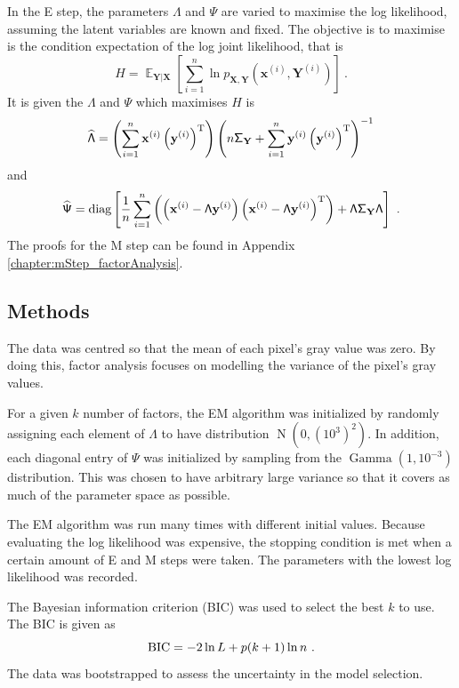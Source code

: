 \documentclass[12pt]{report}
\DeclareMathOperator{\expectation}{\mathbb{E}}
\DeclareMathOperator{\normal}{N}
\DeclareMathOperator{\gammaDist}{Gamma}
\newcommand{\T}{^\textup{T}}
\newcommand{\BIC}{\textup{BIC}}
\newcommand{\vect}[1]{\mathbf{#1}}
\newcommand{\matr}[1]{\mathsf{#1}}
\begin{document}
In the E step, the parameters $\matr{\Lambda}$ and $\matr{\Psi}$ are varied to maximise the log likelihood, assuming the latent variables are known and fixed. The objective is to maximise is the condition expectation of the log joint likelihood, that is
\begin{equation}
H = \expectation_{\vect{Y}|\vect{X}}\left[\sum_{i=1}^{n}\ln p_{\vect{X},\vect{Y}}\left(\vect{x}^{(i)},\vect{Y}^{(i)}\right)\right] \ .
\end{equation}
It is given the $\matr{\Lambda}$ and $\matr{\Psi}$ which maximises $H$ is
\begin{equation}
\widehat{\matr{\Lambda}}
=
\left(\sum_{i=1}^n\vect{x}^{(i)}\left(\vect{y}^{(i)}\right)\T\right)\left(n\matr{\Sigma}_{\vect{Y}}+\sum_{i=1}^{n}\vect{y}^{(i)}\left(\vect{y}^{(i)}\right)\T\right)^{-1}
\end{equation}
and
\begin{equation}
\widehat{\matr{\Psi}} =\text{diag}\left[
\frac{1}{n}\sum_{i=1}^{n}\left(
\left(\vect{x}^{(i)}-\matr{\Lambda}\vect{y}^{(i)}\right)
\left(\vect{x}^{(i)}-\matr{\Lambda}\vect{y}^{(i)}\right)\T
\right)
+\matr{\Lambda}\matr{\Sigma}_{\vect{Y}}\matr{\Lambda}\right]\ .
\end{equation}
The proofs for the M step can be found in Appendix \ref{chapter:mStep_factorAnalysis}.

\subsection{Methods}
The data was centred so that the mean of each pixel's gray value was zero. By doing this, factor analysis focuses on modelling the variance of the pixel's gray values.

For a given $k$ number of factors, the EM algorithm was initialized by randomly assigning each element of $\matr{\Lambda}$ to have distribution $\normal(0,(10^3)^2)$. In addition, each diagonal entry of $\matr{\Psi}$ was initialized by sampling from the $\gammaDist(1,10^{-3})$ distribution. This was chosen to have arbitrary large variance so that it covers as much of the parameter space as possible.

The EM algorithm was run many times with different initial values. Because evaluating the log likelihood was expensive, the stopping condition is met when a certain amount of E and M steps were taken. The parameters with the lowest log likelihood was recorded.

The Bayesian information criterion (BIC) was used to select the best $k$ to use. The BIC is given as
\begin{equation}
\BIC=-2\ln L + p(k+1)\ln n \ .
\end{equation}
The data was bootstrapped to assess the uncertainty in the model selection.
\end{document}
